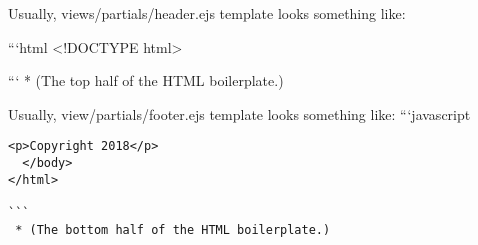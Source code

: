 \documentclass[11pt]{article}
\begin{document}
Usually, views/partials/header.ejs template looks something like:

```html \textless{}!DOCTYPE html\textgreater{}

``` * (The top half of the HTML boilerplate.)

Usually, view/partials/footer.ejs template looks something like:
```javascript

\begin{verbatim}
<p>Copyright 2018</p>
  </body>
</html>

```
 * (The bottom half of the HTML boilerplate.)
\end{verbatim}


    
    
    
    
\end{document}
